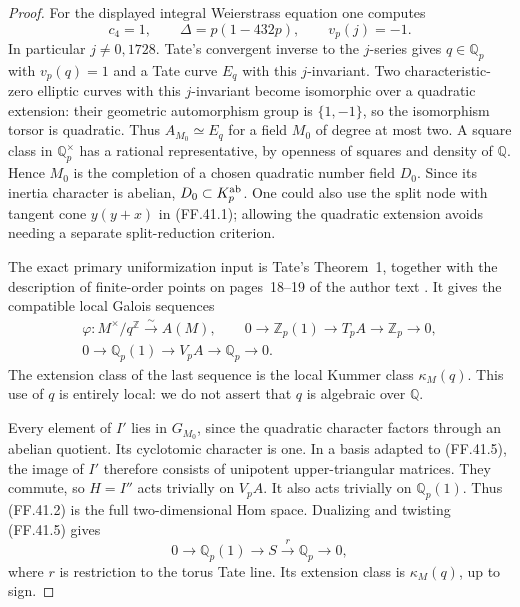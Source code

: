 \begin{proof}
For the displayed integral Weierstrass
equation one computes
\[
             c_4=1,\qquad
             \Delta=p(1-432p),\qquad
             v_p(j)=-1.
                                                        \tag{FF.41.4}
\]
In particular \(j\ne0,1728\).
Tate's convergent inverse to the
\(j\)-series gives \(q\in\mathbb Q_p\)
with \(v_p(q)=1\) and a Tate curve
\(E_q\) with this \(j\)-invariant.
Two characteristic-zero elliptic curves
with this \(j\)-invariant become
isomorphic over a quadratic extension:
their geometric automorphism group
is \(\{1,-1\}\), so the isomorphism
torsor is quadratic. Thus
\(A_{M_0}\simeq E_q\) for a field
\(M_0\) of degree at most two.
A square class in \(\mathbb Q_p^\times\)
has a rational representative, by
openness of squares and density of
\(\mathbb Q\). Hence \(M_0\) is
the completion of a chosen quadratic
number field \(D_0\). Since its
inertia character is abelian,
\(D_0\subset K_p^{\rm ab}\).
One could also use the split node
with tangent cone \(y(y+x)\) in
(FF.41.1); allowing the quadratic
extension avoids needing a separate
split-reduction criterion.

The exact primary uniformization
input is Tate's Theorem~1, together
with the description of finite-order
points on pages~18--19 of the author
text \citep{FF_Tate1995}. It gives
the compatible local Galois sequences
\[
 \begin{gathered}
   \varphi:M^\times/q^{\mathbb Z}
                         \xrightarrow{\sim}A(M),\qquad
   0\longrightarrow\mathbb Z_p(1)
    \longrightarrow T_pA
    \longrightarrow\mathbb Z_p\longrightarrow0,\\
   0\longrightarrow\mathbb Q_p(1)
    \longrightarrow V_pA
    \longrightarrow\mathbb Q_p\longrightarrow0.
 \end{gathered}
                                                        \tag{FF.41.5}
\]
The extension class of the last
sequence is the local Kummer class
\(\kappa_M(q)\). This use of \(q\)
is entirely local: we do not assert
that \(q\) is algebraic over
\(\mathbb Q\).

Every element of \(I'\) lies in
\(G_{M_0}\), since the quadratic
character factors through an abelian
quotient. Its cyclotomic character
is one. In a basis adapted to
(FF.41.5), the image of \(I'\)
therefore consists of unipotent
upper-triangular matrices. They
commute, so \(H=I''\) acts trivially
on \(V_pA\). It also acts trivially
on \(\mathbb Q_p(1)\). Thus (FF.41.2)
is the full two-dimensional Hom space.
Dualizing and twisting (FF.41.5) gives
\[
 0\longrightarrow\mathbb Q_p(1)
  \longrightarrow S
  \xrightarrow{\ r\ }\mathbb Q_p
  \longrightarrow0,
                                                        \tag{FF.41.6}
\]
where \(r\) is restriction to the
torus Tate line. Its extension class
is \(\kappa_M(q)\), up to sign.


\end{proof}
